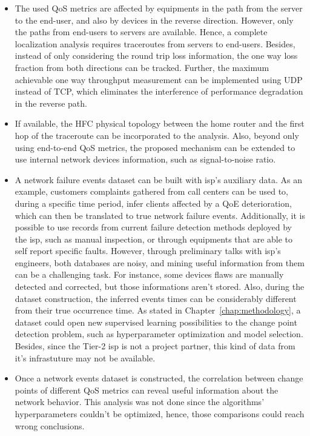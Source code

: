\begin{itemize}
\item
The used QoS metrics are affected by equipments in the path from the server to
the end-user, and also by devices in the reverse direction.
However, only the paths from end-users to servers are available.
Hence, a complete
localization analysis requires traceroutes from servers to end-users.
Besides, instead of only considering the round trip loss information,
the one way loss fraction from both directions can be tracked.
Further, the maximum achievable one way throughput measurement can be
implemented using UDP instead of TCP, which eliminates the interference of
performance degradation in the reverse path.

\item
If available, the HFC physical topology between the home router and the
first hop of the traceroute can be incorporated to the analysis.
Also, beyond only using end-to-end QoS metrics,
the proposed mechanism can be extended
to use internal network devices information, such as signal-to-noise ratio.

\item
A network failure events dataset can be built with \gls*{isp}'s auxiliary data.
As an example, customers complaints gathered from call centers can be used to,
during a specific time period, infer clients affected by a QoE deterioration,
which can then be translated to true network failure events.
Additionally, it is possible to use records from current failure detection
methods deployed by the \gls*{isp}, such as manual inspection, or through equipments
that are able to self report specific faults.
However, through preliminary talks with \gls*{isp}'s engineers,
both databases are noisy, and mining useful information
from them can be a challenging task.
For instance, some devices flaws are manually
detected and corrected, but those informations aren't stored.
Also, during the dataset construction, the inferred events times can be
considerably different from their true occurrence time.
As stated in Chapter~\ref{chap:methodology}, a dataset could open new
supervised learning possibilities to the change point detection problem, such
as hyperparameter optimization and model selection.
Besides, since the Tier-2 \gls*{isp} is not a project partner, this kind of data from
it's infrastuture may not be available.

\item
Once a network events dataset is constructed, the correlation between
change points of different QoS metrics can reveal useful information
about the network behavior. This analysis was not done since the algorithms'
hyperparameters couldn't be optimized, hence, those comparisons could reach
wrong conclusions.


\end{itemize}
